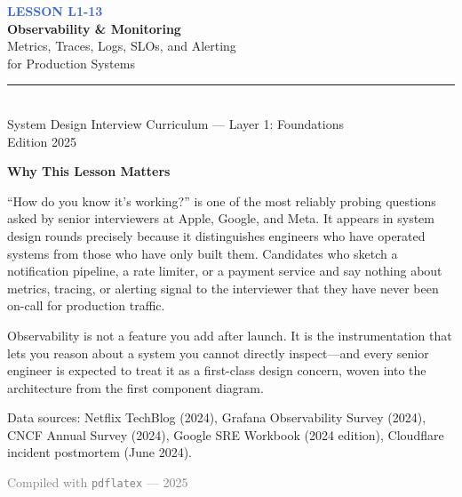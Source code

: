 \documentclass[11pt,a4paper]{article}
\begin{document}
\begin{titlepage}
  \centering
  \vspace*{2cm}
  {\small\textcolor{highlight}{\textbf{LESSON L1-13}}}\\[0.4cm]
  {\Huge\bfseries\color{primary} Observability \& Monitoring}\\[0.6cm]
  {\large\color{accent} Metrics, Traces, Logs, SLOs, and Alerting\\for Production Systems}\\[1.2cm]
  \rule{0.5\linewidth}{0.5pt}\\[1.2cm]
  {\normalsize\color{highlight} System Design Interview Curriculum --- Layer 1: Foundations}\\[0.4cm]
  {\normalsize Edition 2025}\\[1.8cm]

  \begin{insightbox}
    \textbf{Why This Lesson Matters}

    ``How do you know it's working?'' is one of the most reliably probing questions asked by senior interviewers at Apple, Google, and Meta. It appears in system design rounds precisely because it distinguishes engineers who have operated systems from those who have only built them. Candidates who sketch a notification pipeline, a rate limiter, or a payment service and say nothing about metrics, tracing, or alerting signal to the interviewer that they have never been on-call for production traffic.

    Observability is not a feature you add after launch. It is the instrumentation that lets you reason about a system you cannot directly inspect---and every senior engineer is expected to treat it as a first-class design concern, woven into the architecture from the first component diagram.

    Data sources: Netflix TechBlog (2024), Grafana Observability Survey (2024), CNCF Annual Survey (2024), Google SRE Workbook (2024 edition), Cloudflare incident postmortem (June 2024).
  \end{insightbox}

  \vfill
  {\small\textcolor{gray}{Compiled with \texttt{pdflatex} --- 2025}}
\end{titlepage}

\tableofcontents
\newpage
\end{document}
